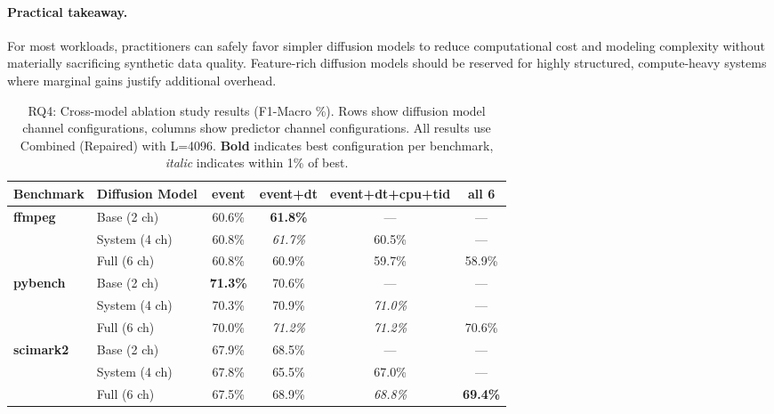 \paragraph{Practical takeaway.}
For most workloads, practitioners can safely favor simpler diffusion models to reduce computational cost and modeling complexity without materially sacrificing synthetic data quality. Feature-rich diffusion models should be reserved for highly structured, compute-heavy systems where marginal gains justify additional overhead.


\begin{table}[t]
\centering
\caption{RQ4: Cross-model ablation study results (F1-Macro \%). Rows show diffusion model channel configurations, columns show predictor channel configurations. All results use Combined (Repaired) with L=4096. \textbf{Bold} indicates best configuration per benchmark, \textit{italic} indicates within 1\% of best.}
\label{tab:rq4}
\footnotesize
\setlength{\tabcolsep}{3pt}
\begin{tabular}{@{}llcccc@{}}
\toprule
\textbf{Benchmark} & \textbf{Diffusion Model} & \textbf{event} & \textbf{event+dt} & \textbf{event+dt+cpu+tid} & \textbf{all 6} \\
\midrule
\multirow{3}{*}{\textbf{ffmpeg}}
& Base (2 ch) & 60.6\% & \textbf{61.8\%} & --- & --- \\
& System (4 ch) & 60.8\% & \textit{61.7\%} & 60.5\% & --- \\
& Full (6 ch) & 60.8\% & 60.9\% & 59.7\% & 58.9\% \\
\midrule
\multirow{3}{*}{\textbf{pybench}}
& Base (2 ch) & \textbf{71.3\%} & 70.6\% & --- & --- \\
& System (4 ch) & 70.3\% & 70.9\% & \textit{71.0\%} & --- \\
& Full (6 ch) & 70.0\% & \textit{71.2\%} & \textit{71.2\%} & 70.6\% \\
\midrule
\multirow{3}{*}{\textbf{scimark2}}
& Base (2 ch) & 67.9\% & 68.5\% & --- & --- \\
& System (4 ch) & 67.8\% & 65.5\% & 67.0\% & --- \\
& Full (6 ch) & 67.5\% & 68.9\% & \textit{68.8\%} & \textbf{69.4\%} \\
\bottomrule
\end{tabular}
\end{table}






